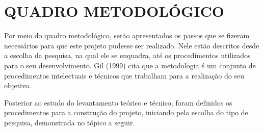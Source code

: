 
\chapter{QUADRO METODOLÓGICO}
\label{cap:quadroMetodologico}


\par Por meio do quadro metodológico, serão apresentados os passos que se fizeram necessários para que este projeto pudesse ser realizado. Nele estão descritos desde a escolha da pesquisa, na qual ele se enquadra, até os procedimentos utilizados para o seu desenvolvimento. Gil (1999) cita que a metodologia é um conjunto de procedimentos intelectuais e técnicos que trabalham para a realização do seu objetivo.
\par Posterior ao estudo do levantamento teórico e técnico, foram definidos os procedimentos para a construção do projeto, iniciando pela escolha do tipo de pesquisa, demonstrada no tópico a seguir.



















